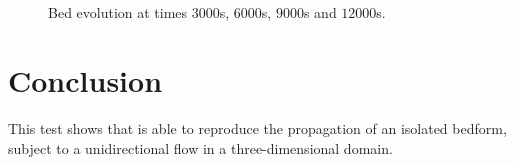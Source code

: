 \begin{figure}[H]
 \begin{minipage}[t]{0.5\textwidth}
  \centering
 \end{minipage}%
 \begin{minipage}[t]{0.5\textwidth}
  \centering
 \end{minipage}
 \\
  \begin{minipage}[t]{0.5\textwidth}
  \centering
 \end{minipage}%
 \begin{minipage}[t]{0.5\textwidth}
  \centering
 \end{minipage}
 \caption{Bed evolution at times $3000$s, $6000$s, $9000$s and $12000$s.}
 \label{fig:bosse-t3d:solution}
\end{figure}


\section{Conclusion}
This test shows that \gaia{} is able to reproduce the propagation of an isolated bedform, subject to a unidirectional flow in a three-dimensional domain.
%
%
%
%




